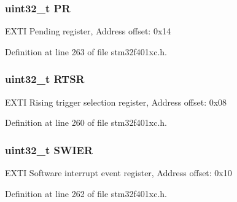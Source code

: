 \subsubsection[{\texorpdfstring{PR}{PR}}]{ uint32\+\_\+t PR}\hypertarget{struct_e_x_t_i___type_def_af8d25514079514d38c104402f46470af}{}\label{struct_e_x_t_i___type_def_af8d25514079514d38c104402f46470af}
E\+X\+TI Pending register, Address offset\+: 0x14 

Definition at line 263 of file stm32f401xc.\+h.

\subsubsection[{\texorpdfstring{R\+T\+SR}{RTSR}}]{ uint32\+\_\+t R\+T\+SR}\hypertarget{struct_e_x_t_i___type_def_a0d952a17455687d6e9053730d028fa1d}{}\label{struct_e_x_t_i___type_def_a0d952a17455687d6e9053730d028fa1d}
E\+X\+TI Rising trigger selection register, Address offset\+: 0x08 

Definition at line 260 of file stm32f401xc.\+h.

\subsubsection[{\texorpdfstring{S\+W\+I\+ER}{SWIER}}]{ uint32\+\_\+t S\+W\+I\+ER}\hypertarget{struct_e_x_t_i___type_def_a9eae93b6cc13d4d25e12f2224e2369c9}{}\label{struct_e_x_t_i___type_def_a9eae93b6cc13d4d25e12f2224e2369c9}
E\+X\+TI Software interrupt event register, Address offset\+: 0x10 

Definition at line 262 of file stm32f401xc.\+h.



